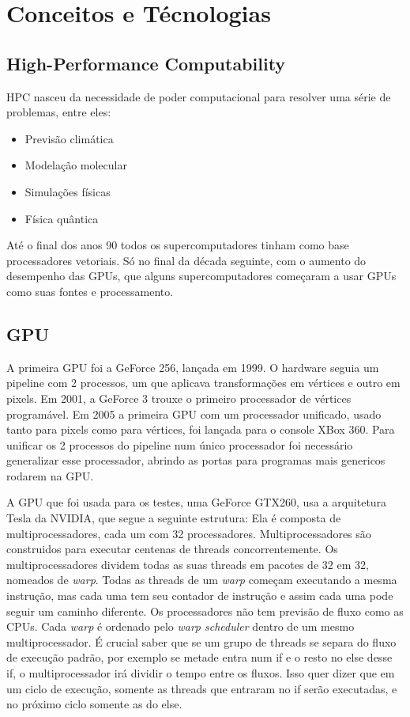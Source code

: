 \section{Conceitos e Técnologias}
\subsection{High-Performance Computability}
HPC nasceu da necessidade de poder computacional para resolver uma série de problemas, entre eles:
\begin{itemize}
  \item Previsão climática
  \item Modelação molecular
  \item Simulações físicas
  \item Física quântica
\end{itemize}
Até o final dos anos 90 todos os supercomputadores tinham como base processadores vetoriais. Só no final da década seguinte, 
com o aumento do desempenho das GPUs, que alguns supercomputadores começaram a usar GPUs como suas fontes e processamento.
\subsection{GPU}
A primeira GPU foi a GeForce 256, lançada em 1999. O hardware seguia um pipeline com 2 processos, um que aplicava transformações
em vértices e outro em pixels. Em 2001, a GeForce 3 trouxe o primeiro processador de vértices programável. Em 2005 a primeira
GPU com um processador unificado, usado tanto para pixels como para vértices, foi lançada para o console XBox 360. Para unificar
os 2 processos do pipeline num único processador foi necessário generalizar esse processador, abrindo as portas para programas
mais genericos rodarem na GPU.

A GPU que foi usada para os testes, uma GeForce GTX260, usa a arquitetura Tesla da NVIDIA, que segue a seguinte estrutura:
Ela é composta de multiprocessadores, cada um com 32 processadores. Multiprocessadores
são construidos para executar centenas de threads concorrentemente. Os multiprocessadores dividem todas as suas threads
em pacotes de 32 em 32, nomeados de \textit{warp}. Todas as threads de um \textit{warp} começam executando a mesma instrução,
mas cada uma tem seu contador de instrução e assim cada uma pode seguir um caminho diferente. Os processadores não tem
previsão de fluxo como as CPUs. Cada \textit{warp} é ordenado pelo \textit{warp scheduler} dentro de um mesmo multiprocessador.
É crucial saber que se um grupo de threads se separa do fluxo de execução padrão, por exemplo se metade entra num if e o resto
no else desse if, o multiprocessador irá dividir o tempo entre os fluxos. Isso quer dizer que em um ciclo de execução,
somente as threads que entraram no if serão executadas, e no próximo ciclo somente as do else. 


